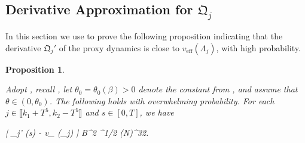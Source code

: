 \documentclass{amsart}
\numberwithin{equation}{section}
\DeclareMathOperator{\eff}{eff}
\newtheorem{prop}[thm]{Proposition}
\theoremstyle{remark}
\theoremstyle{definition}
\begin{document}
	\subsection{Derivative Approximation for $\mathfrak{Q}_j$}
	
	\label{EquationQ}
	
	In this section we use  to prove the following proposition indicating that the derivative $\mathfrak{Q}_j'$ of the proxy dynamics is close to $v_{\eff} (\Lambda_j)$, with high probability. 
	
	\begin{prop} 
		\label{qv} 
		
		Adopt , recall , let $\theta_0 = \theta_0 (\beta) > 0$ denote the constant from , and assume that $\theta \in (0, \theta_0)$. The following holds with overwhelming probability. For each $j \in \llbracket k_1 + T^5 , k_2 - T^5  \rrbracket$ and $s \in [0, T]$, we have 
		\begin{flalign*} 
			| _j' (s) - v_{\eff} (\Lambda_j) | \le B^2 ^{1/2} (\log N)^{32}.
		\end{flalign*} 
		
	\end{prop}
	
\end{document}
